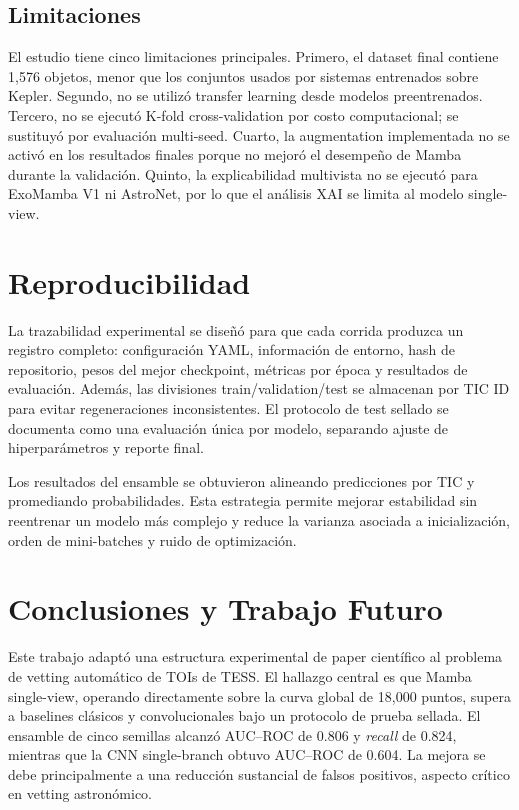 \documentclass[conference]{IEEEtran}
\newcommand{\aucroc}{AUC--ROC}
\begin{document}
\subsection{Limitaciones}

El estudio tiene cinco limitaciones principales. Primero, el dataset final contiene 1,576 objetos, menor que los conjuntos usados por sistemas entrenados sobre Kepler. Segundo, no se utilizó transfer learning desde modelos preentrenados. Tercero, no se ejecutó K-fold cross-validation por costo computacional; se sustituyó por evaluación multi-seed. Cuarto, la augmentation implementada no se activó en los resultados finales porque no mejoró el desempeño de Mamba durante la validación. Quinto, la explicabilidad multivista no se ejecutó para ExoMamba V1 ni AstroNet, por lo que el análisis XAI se limita al modelo single-view.

\section{Reproducibilidad}

La trazabilidad experimental se diseñó para que cada corrida produzca un registro completo: configuración YAML, información de entorno, hash de repositorio, pesos del mejor checkpoint, métricas por época y resultados de evaluación. Además, las divisiones train/validation/test se almacenan por TIC ID para evitar regeneraciones inconsistentes. El protocolo de test sellado se documenta como una evaluación única por modelo, separando ajuste de hiperparámetros y reporte final.

Los resultados del ensamble se obtuvieron alineando predicciones por TIC y promediando probabilidades. Esta estrategia permite mejorar estabilidad sin reentrenar un modelo más complejo y reduce la varianza asociada a inicialización, orden de mini-batches y ruido de optimización.

\section{Conclusiones y Trabajo Futuro}

Este trabajo adaptó una estructura experimental de paper científico al problema de vetting automático de TOIs de TESS. El hallazgo central es que Mamba single-view, operando directamente sobre la curva global de 18,000 puntos, supera a baselines clásicos y convolucionales bajo un protocolo de prueba sellada. El ensamble de cinco semillas alcanzó \aucroc{} de 0.806 y \textit{recall} de 0.824, mientras que la CNN single-branch obtuvo \aucroc{} de 0.604. La mejora se debe principalmente a una reducción sustancial de falsos positivos, aspecto crítico en vetting astronómico.
\end{document}
